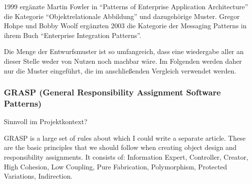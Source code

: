 1999 ergänzte Martin Fowler in \enquote{Patterns of Enterprise Application Architecture}\cite{patterns-of-enterprise-application-architecture} die Kategorie \enquote{Objektrelationale Abbildung} und dazugehörige Muster.
Gregor Hohpe und Bobby Woolf ergänzten 2003 die Kategorie der Messaging Patterns in ihrem Buch \enquote{Enterprise Integration Patterns}\cite{enterprise-integration-patterns}.

Die Menge der Entwurfsmuster ist so umfangreich, dass eine wiedergabe aller an dieser Stelle weder von Nutzen noch machbar wäre.
Im Folgenden werden daher nur die Muster eingeführt, die im anschließenden Vergleich verwendet werden.

\subsubsection{GRASP (General Responsibility Assignment Software Patterns)}
Sinnvoll im Projektkontext?

GRASP is a large set of rules about which I could write a separate article.
These are the basic principles that we should follow when creating object design and responsibility assignments.
It consists of: Information Expert, Controller, Creator, High Cohesion, Low Coupling, Pure Fabrication, Polymorphism, Protected Variations, Indirection.
